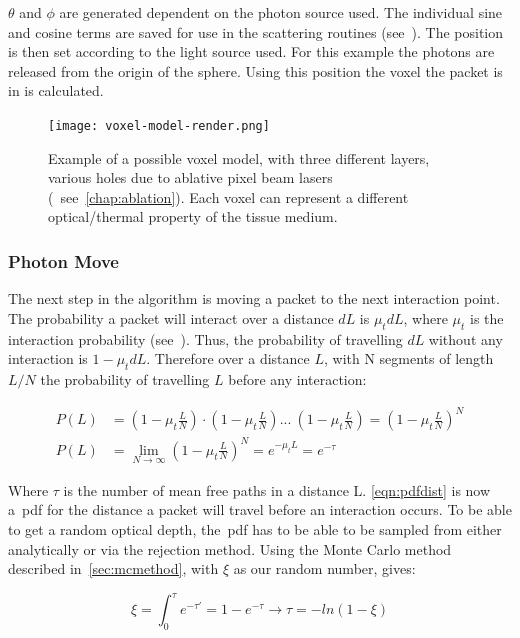 $\theta$ and $\phi$ are generated dependent on the photon source used. The individual sine and cosine terms are saved for use in the scattering routines (see~).
The position is then set according to the light source used.
For this example the photons are released from the origin of the sphere.
Using this position the voxel the packet is in is calculated.
\FloatBarrier

\begin{figure}[!ht]
\centering
\texttt{[image: voxel-model-render.png]}
\caption{Example of a possible voxel model, with three different layers, various holes due to ablative pixel beam lasers (~see~\cref{chap:ablation}). Each voxel can represent a different optical/thermal property of the tissue medium.}
\label{fig:voxel-model}
\vspace{-20pt}
\end{figure}
\subsubsection*{Photon Move}\label{sec:photmove}

The next step in the algorithm is moving a packet to the next interaction point. The probability a packet will interact over a distance $dL$ is $\mu_tdL$, where $\mu_t$ is the interaction probability (see~). Thus, the probability of travelling $dL$ without any interaction is $1-\mu_tdL$. Therefore over a distance $L$, with N segments of length $L/N$ the probability of travelling $L$ before any interaction:

\begin{align}
P(L) &= (1-\mu_t\frac{L}{N}) \cdot (1-\mu_t\frac{L}{N}) ...\ (1-\mu_t\frac{L}{N}) = (1-\mu_t\frac{L}{N})^N \\
P(L) &= \lim_{N \to \infty}(1-\mu_t\frac{L}{N})^N=e^{-\mu_tL}=e^{-\tau}\label{eqn:pdfdist}
\end{align}

Where $\tau$ is the number of mean free paths in a distance L. \cref{eqn:pdfdist} is now a~\gls*{pdf} for the distance a packet will travel before an interaction occurs. To be able to get a random optical depth, the~\gls*{pdf} has to be able to be sampled from either analytically or via the rejection method.
Using the Monte Carlo method described in~\cref{sec:mcmethod}, with $\xi$ as our random number, gives:

\begin{equation}
\xi=\int_{0}^{\tau}e^{-\tau'}=1-e^{-\tau}\rightarrow \tau=-ln(1-\xi)
\end{equation}

